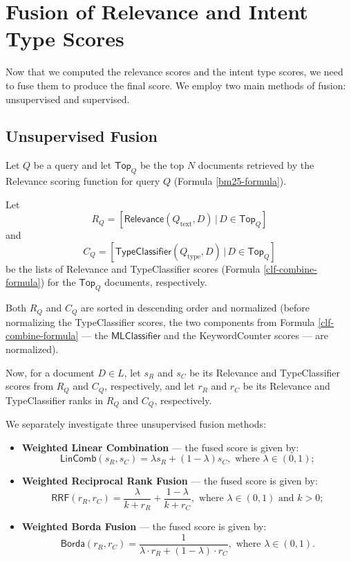 \section{Fusion of Relevance and Intent Type Scores}\label{fusion-theory}
Now that we computed the relevance scores and the intent type scores, we need to fuse them to produce the final score.
We employ two main methods of fusion: unsupervised and supervised.

\subsection{Unsupervised Fusion}\label{unsup-fusion-theory}
Let $Q$ be a query and let $\textsf{Top}_Q$ be the top $N$ documents retrieved by the \textsf{Relevance}
scoring function for query $Q$ (Formula \ref{bm25-formula}).

Let
\[R_Q = [\textsf{Relevance}(Q_{\text{text}}, D) \,|\, D\in \textsf{Top}_Q]\]
and
\[C_Q = [\textsf{TypeClassifier}(Q_{\text{type}}, D) \,|\, D\in \textsf{Top}_Q]\]
be the lists of \textsf{Relevance} and
\textsf{TypeClassifier} scores (Formula \ref{clf-combine-formula})
for the $\textsf{Top}_Q$ documents, respectively.

Both $R_Q$ and $C_Q$ are sorted in descending order and normalized
(before normalizing the \textsf{TypeClassifier} scores, the
two components from Formula \ref{clf-combine-formula} --- the
$\textsf{MLClassifier}$ and the \textsf{KeywordCounter} scores --- are normalized).

Now, for a document $D\in L$, let $s_R$ and $s_C$ be its \textsf{Relevance} and \textsf{TypeClassifier}
scores from $R_Q$ and $C_Q$, respectively,
and let
$r_R$ and $r_C$ be its \textsf{Relevance} and \textsf{TypeClassifier} ranks in $R_Q$ and $C_Q$, respectively.

We separately investigate three unsupervised fusion methods:
\begin{itemize}

 \item \textbf{Weighted Linear Combination} --- the fused score is given by:
 \begin{equation} \label{interp-formula}
 \textsf{LinComb}(s_R, s_C) = \lambda s_R + (1-\lambda) s_C, \text{ where } \lambda \in (0,1);
 \end{equation}

\item \textbf{Weighted Reciprocal Rank Fusion} \cite{rrf} --- the fused score is given by:
 \begin{equation}\label{rrf-formula}
  \textsf{RRF}(r_R, r_C) =  \displaystyle\frac{\lambda}{k + r_R} + \displaystyle\frac{1- \lambda}{k + r_C},  \text{ where } \lambda \in (0,1)
  \text{ and } k>0;
 \end{equation}

 \item \textbf{Weighted Borda Fusion} \cite{borda} ---  the fused score is given by:
 \begin{equation}\label{borda-formula}
   \textsf{Borda}(r_R, r_C) =  \displaystyle\frac{1}{\lambda \cdot r_R + (1-\lambda)\cdot r_C},  \text{ where } \lambda \in (0,1).
 \end{equation}
  \end{itemize}

